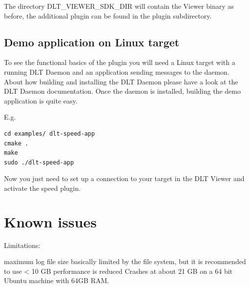 \documentclass[a4paper,11pt]{article}
\begin{document}
The directory DLT\_VIEWER\_SDK\_DIR will contain the Viewer binary as before, the additional plugin can be found
in the plugin subdirectory.

\subsection{Demo application on Linux target}
To see the functional basics of the plugin you will need a Linux target with a running DLT Daemon and an application
sending messages to the daemon. About how building and installing the DLT Daemon please have a look at the DLT Daemon documentation.
Once the daemon is installed, building the demo application is quite easy.

E.g.
\begin{verbatim}
cd examples/ dlt-speed-app
cmake .
make
sudo ./dlt-speed-app
\end{verbatim}

Now you just need to set up a connection to your target in the DLT Viewer and activate the speed plugin.

\pagebreak
\section{Known issues}

Limitations:

maximum log file size basically limited by the file system, but it is recommended to use < 10 GB
performance is reduced
Crashes at about 21 GB on a 64 bit Ubuntu machine with 64GB RAM.

\end{document}
